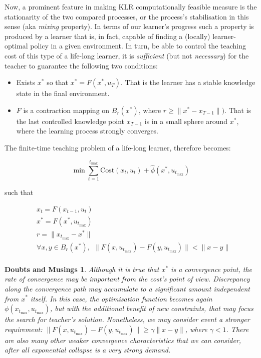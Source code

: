 \documentclass{article}
\newcommand{\ct}{\ensuremath{\mathrm{Cost}(x_t,u_t)}}
\newtheorem{doubt}{Doubts and Musings}
\begin{document}
Now, a prominent feature in making KLR computationally feasible
measure is the stationarity of the two compared processes, or the
process's stabilisation in this sense (aka {\em mixing} property). In
terms of our learner's progress such a property is produced by a
learner that is, in fact, capable of finding a (locally)
learner-optimal policy in a given environment. In turn, be able to
control the teaching cost of this type of a life-long learner, it is {\em
  sufficient} (but not {\em necessary}) for the teacher to guarantee
the following two conditions:
\begin{itemize}
\item Exists $x^*$ so that $x^*=F(x^*,u_T)$. That is the learner has a stable knowledge state in the final environment. 
\item $F$ is a contraction mapping on $B_r(x^*)$, where $r\geq\|x^*-x_{T-1}\|)$. That is the last controlled knowledge point $x_{T-1}$ is in a small sphere around $x^*$, where the learning process strongly converges. 
\end{itemize}

The finite-time teaching problem of a life-long learner, therefore becomes:

\[
\min \sum\limits_{t=1}^{t_{\max}}\ct + \widehat{\phi}(x^*, u_{t_{\max}})
\]
\centerline{such that}
\begin{eqnarray*}
&x_t=F(x_{t-1},u_t)\\
&x^*=F(x^*,u_{t_{\max}})\\
&r=\|x_{t_{\max}}-x^*\|\\
&\forall x,y\in B_r(x^*),\ \ \|F(x,u_{t_{\max}})-F(y,u_{t_{\max}})\|<\|x-y\|\\
\end{eqnarray*}

\begin{doubt}
Although it is true that $x^*$ is a convergence point, the rate of
convergence may be important from the cost's point of
view. Discrepancy along the convergence path may accumulate to a
significant amount independent from $x^*$ itself. In this case, the optimisation function becomes again $\phi(x_{t_{\max}}, u_{t_{\max}})$, but with the additional benefit of new constraints, that may focus the search for teacher's solution. Nonetheless, we may consider
event a stronger requirement:
$\|F(x,u_{t_{\max}})-F(y,u_{t_{\max}})\|\geq\gamma\|x-y\|$, where
$\gamma<1$. There are also many other weaker convergence
characteristics that we can consider, after all exponential collapse
is a {\em very} strong demand.
\end{doubt}
\end{document}
